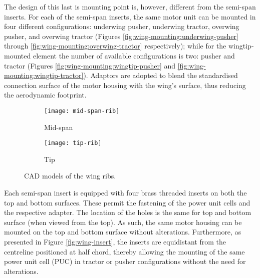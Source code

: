 \documentclass[../../main.tex]{subfiles}
\begin{document}
The design of this last is mounting point is, however, different from the semi-span inserts.
For each of the semi-span inserts, the same motor unit can be mounted in four different configurations: underwing pusher, underwing tractor, overwing pusher, and overwing tractor (Figures \ref{fig:wing-mounting:underwing-pusher} through \ref{fig:wing-mounting:overwing-tractor} respectively); while for the wingtip-mounted element the number of available configurations is two: pusher and tractor (Figures \ref{fig:wing-mounting:wingtip-pusher} and \ref{fig:wing-mounting:wingtip-tractor}).
Adaptors are adopted to blend the standardised connection surface of the motor housing with the wing's surface, thus reducing the aerodynamic footprint. 



\begin{figure}[H]
    \centering
    \begin{subfigure}[b]{0.49\columnwidth}
        \centering
        \texttt{[image: mid-span-rib]}
        \caption{Mid-span}
        \label{fig:ribs:mid-span}
    \end{subfigure}
    \hfill
    \begin{subfigure}[b]{0.49\columnwidth}
        \centering
        \texttt{[image: tip-rib]}
        \caption{Tip}
        \label{fig:ribs:tip}
    \end{subfigure}
    
    \caption{CAD models of the wing ribs.}
    \label{fig:ribs}
\end{figure}


Each semi-span insert is equipped with four brass threaded inserts on both the top and bottom surfaces.
These permit the fastening of the power unit cells and the respective adapter.
The location of the holes is the same for top and bottom surface (when viewed from the top).
As such, the same motor housing can be mounted on the top and bottom surface without alterations.
Furthermore, as presented in Figure \ref{fig:wing-insert}, the inserts are equidistant from the centreline positioned at half chord, thereby allowing the mounting of the same power unit cell (PUC) in tractor or pusher configurations without the need for alterations. 
\end{document}
